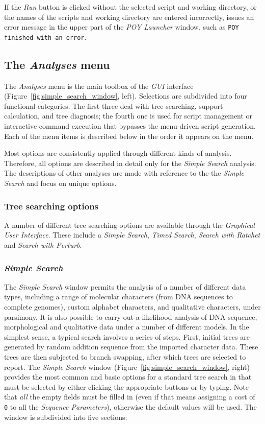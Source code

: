 If the \emph{Run} button is clicked without the selected script and
working directory, or the names of the scripts and working directory are entered incorrectly, \poy issues an
error message in the upper part of the \emph{POY Launcher} window,
such as \texttt{POY finished with an error}.

\subsection{The \emph{Analyses} menu}
The \emph{Analyses} menu is the main toolbox of the \poy \emph{GUI} interface (Figure~\ref{fig:simple_search_window}, left). 
Selections are subdivided into four functional categories. The first three deal with tree searching, support calculation, 
and tree diagnosis; the fourth one is used for  script management or interactive command execution that bypasses the 
menu-driven script generation. Each of the menu items is described below in the order it appears on the menu.

Most options are consistently applied through different kinds of analysis. Therefore, all options are described in detail 
only for the \emph{Simple Search} analysis. The descriptions of other analyses are made with reference to the the 
\emph{Simple Search} and focus on unique options.


\subsubsection{Tree searching options}

A number of different tree searching options are available through the \emph{Graphical User Interface}.  
These include a \emph{Simple Search}, \emph{Timed Search}, \emph{Search with Ratchet} and 
\emph{Search with Perturb}. 

\subsubsection*{\emph{Simple Search}}
The \emph{Simple Search} window permits the analysis of a number of different data types, 
including a range of molecular characters (from DNA sequences to complete genomes), custom alphabet 
characters, and qualitative characters, under parsimony.  It is also possible to carry out a likelihood 
analysis of DNA sequence, morphological and qualitative data 
under a number of different models.  In the simplest sense, a typical search involves a series of steps. 
First, initial trees are generated by random addition sequence from the imported character data. 
These trees are then subjected to branch swapping, after which trees are selected to report. 
The \emph{Simple Search} window (Figure~\ref{fig:simple_search_window}, right) 
provides the most common and basic options for a standard tree search in \poy that must be selected 
by either clicking the appropriate buttons or by typing. Note that \emph{all} the empty fields must 
be filled in (even if that means assigning a cost of \texttt{0} to all the \emph{Sequence Parameters}), 
otherwise the default values will be used. The window is subdivided into five sections: 

